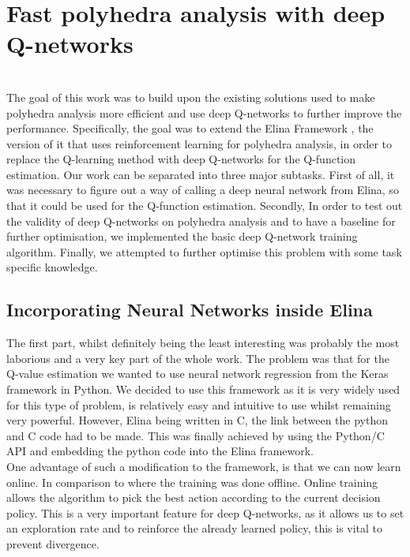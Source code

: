 
\chapter{Fast polyhedra analysis with deep Q-networks}
\mbox{}\\
The goal of this work was to build upon the existing solutions used to make polyhedra analysis more efficient and use deep Q-networks to further improve the performance. Specifically, the goal was to extend the Elina Framework \cite{elina}, the version of it that uses reinforcement learning for polyhedra analysis, in order to replace the Q-learning method with deep Q-networks for the Q-function estimation. Our work can be separated into three major subtasks. First of all, it was necessary to figure out a way of calling a deep neural network from Elina, so that it could be used for the Q-function estimation. Secondly, In order to test out the validity of deep Q-networks on polyhedra analysis and to have a baseline for further optimisation, we implemented the basic deep Q-network training algorithm. Finally, we attempted to further optimise this problem with some task specific knowledge.

\section{Incorporating Neural Networks inside Elina}
The first part, whilst definitely being the least interesting was probably the most laborious and a very key part of the whole work. The problem was that for the Q-value estimation we wanted to use neural network regression from the Keras framework in Python. We decided to use this framework as it is very widely used for this type of problem, is relatively easy and intuitive to use whilst remaining very powerful. However, Elina being written in C, the link between the python and C code had to be made. This was finally achieved  by using the Python/C API and embedding the python code into the Elina framework.\\
One advantage of such a modification to the framework, is that we can now learn online. In comparison to \cite{singh2018fast} where the training was done offline. Online training allows the algorithm to pick the best action according to the current decision policy. This is a very important feature for deep Q-networks, as it allows us to set an exploration rate and to reinforce the already learned policy, this is vital to prevent divergence.
